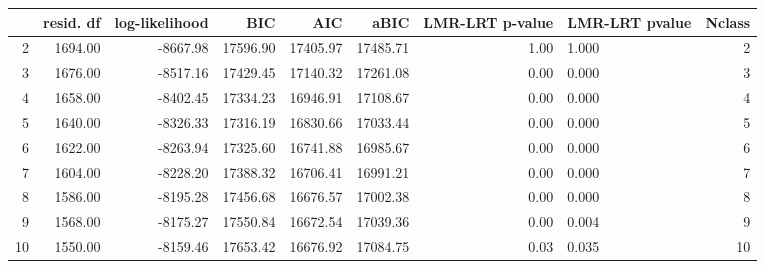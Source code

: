 \begin{table}[ht]
\centering
\begin{tabular}{rrrrrrrlr}
  \hline
 & resid. df & log-likelihood & BIC & AIC & aBIC & LMR-LRT p-value & LMR-LRT pvalue & Nclass \\ 
  \hline
2 & 1694.00 & -8667.98 & 17596.90 & 17405.97 & 17485.71 & 1.00 & 1.000 &   2 \\ 
  3 & 1676.00 & -8517.16 & 17429.45 & 17140.32 & 17261.08 & 0.00 & 0.000 &   3 \\ 
  4 & 1658.00 & -8402.45 & 17334.23 & 16946.91 & 17108.67 & 0.00 & 0.000 &   4 \\ 
  5 & 1640.00 & -8326.33 & 17316.19 & 16830.66 & 17033.44 & 0.00 & 0.000 &   5 \\ 
  6 & 1622.00 & -8263.94 & 17325.60 & 16741.88 & 16985.67 & 0.00 & 0.000 &   6 \\ 
  7 & 1604.00 & -8228.20 & 17388.32 & 16706.41 & 16991.21 & 0.00 & 0.000 &   7 \\ 
  8 & 1586.00 & -8195.28 & 17456.68 & 16676.57 & 17002.38 & 0.00 & 0.000 &   8 \\ 
  9 & 1568.00 & -8175.27 & 17550.84 & 16672.54 & 17039.36 & 0.00 & 0.004 &   9 \\ 
  10 & 1550.00 & -8159.46 & 17653.42 & 16676.92 & 17084.75 & 0.03 & 0.035 &  10 \\ 
   \hline
\end{tabular}
\end{table}
